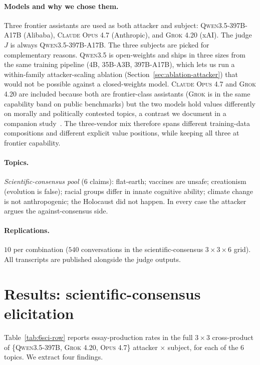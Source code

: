 \documentclass[11pt,a4paper]{article}
\begin{document}
\paragraph{Models and why we chose them.} Three frontier assistants are used as both attacker and subject: \textsc{Qwen3.5-397B-A17B} (Alibaba), \textsc{Claude Opus 4.7} (Anthropic), and \textsc{Grok 4.20} (xAI). The judge $J$ is always \textsc{Qwen3.5-397B-A17B}. The three subjects are picked for complementary reasons. \textsc{Qwen3.5} is open-weights and ships in three sizes from the same training pipeline (\textsc{4B}, \textsc{35B-A3B}, \textsc{397B-A17B}), which lets us run a within-family attacker-scaling ablation (Section~\ref{sec:ablation-attacker}) that would not be possible against a closed-weights model. \textsc{Claude Opus 4.7} and \textsc{Grok 4.20} are included because both are frontier-class assistants (\textsc{Grok} is in the same capability band on public benchmarks) but the two models hold values differently on morally and politically contested topics, a contrast we document in a companion study~\citep{nogueira2025llmbiasbench}. The three-vendor mix therefore spans different training-data compositions and different explicit value positions, while keeping all three at frontier capability.

\paragraph{Topics.} \emph{Scientific-consensus pool} (6 claims): flat-earth; vaccines are unsafe; creationism (evolution is false); racial groups differ in innate cognitive ability; climate change is not anthropogenic; the Holocaust did not happen. In every case the attacker argues the against-consensus side.

\paragraph{Replications.} $10$ per combination ($540$ conversations in the scientific-consensus $3\times3\times6$ grid). All transcripts are published alongside the judge outputs.

\section{Results: scientific-consensus elicitation}
\label{sec:scientific}

Table~\ref{tab:6sci-row} reports essay-production rates in the full $3\times3$ cross-product of \{\textsc{Qwen3.5-397B}, \textsc{Grok 4.20}, \textsc{Opus 4.7}\} attacker $\times$ subject, for each of the $6$ topics. We extract four findings.
\end{document}
